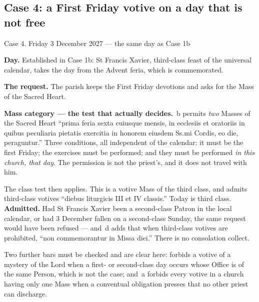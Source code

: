 \subsection{Case 4: a First Friday votive on a day that is not free}

\begin{casebox}{Case 4. Friday 3 December 2027 --- the same day as Case 1b}

\begin{steps}
\item \textbf{Day.} Established in Case 1b: St Francis Xavier, third-class
feast of the universal calendar, takes the day from the Advent feria, which is
commemorated.

\item \textbf{The request.} The parish keeps the First Friday devotions and
asks for the Mass of the Sacred Heart.

\item \textbf{Mass category --- the test that actually decides.} \,b
permits \emph{two} Masses of the Sacred Heart ``prima feria sexta cuiusque
mensis, in ecclesiis et oratoriis in quibus peculiaria pietatis exercitia in
honorem eiusdem Ss.mi Cordis, eo die, peraguntur.'' Three conditions, all
independent of the calendar: it must be the first Friday; the exercises must be
performed; and they must be performed \emph{in this church, that day}. The
permission is not the priest's, and it does not travel with him.

The class test then applies. This is a votive Mass of the third class, and
 admits third-class votives ``diebus liturgicis III et IV classis.''
Today is third class. \textbf{Admitted.} Had St Francis Xavier been a
second-class Patron in the local calendar, or had 3 December fallen on a
second-class Sunday, the same request would have been refused --- and
\,d adds that when third-class votives are prohibited, ``non
commemorantur in Missa diei.'' There is no consolation collect.

Two further bars must be checked and are clear here:  forbids a
votive of a mystery of the Lord when a first- or second-class day occurs whose
Office is of the same Person, which is not the case; and \,a forbids
every votive in a church having only one Mass when a conventual obligation
presses that no other priest can discharge.


\end{steps}
\end{casebox}
